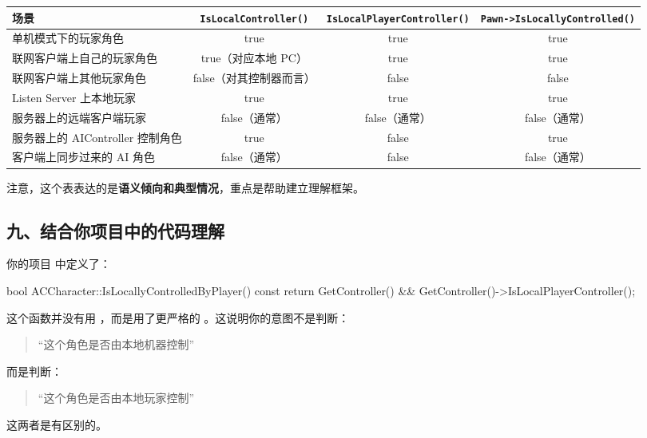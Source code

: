 \begin{center}\footnotesize
	\renewcommand{\arraystretch}{1.5}
	\begin{tabular}{|p{4.2cm}|c|c|c|}
		\hline
		\textbf{场景} & \texttt{IsLocalController()} & \texttt{IsLocalPlayerController()} & \texttt{Pawn->IsLocallyControlled()} \\
		\hline
		单机模式下的玩家角色 & true & true & true \\
		\hline
		联网客户端上自己的玩家角色 & true（对应本地 PC） & true & true \\
		\hline
		联网客户端上其他玩家角色 & false（对其控制器而言） & false & false \\
		\hline
		Listen Server 上本地玩家 & true & true & true \\
		\hline
		服务器上的远端客户端玩家 & false（通常） & false（通常） & false（通常） \\
		\hline
		服务器上的 AIController 控制角色 & true & false & true \\
		\hline
		客户端上同步过来的 AI 角色 & false（通常） & false & false（通常） \\
		\hline
	\end{tabular}
\end{center}

注意，这个表表达的是\textbf{语义倾向和典型情况}，重点是帮助建立理解框架。

\subsection{九、结合你项目中的代码理解}

你的项目  中定义了：
\begin{code}
	bool ACCharacter::IsLocallyControlledByPlayer() const
	{
		return GetController() && GetController()->IsLocalPlayerController();
	}
\end{code}

这个函数并没有用 ，而是用了更严格的 。这说明你的意图不是判断：

\begin{quote}
	“这个角色是否由本地机器控制”
\end{quote}

而是判断：

\begin{quote}
	“这个角色是否由本地玩家控制”
\end{quote}

这两者是有区别的。

